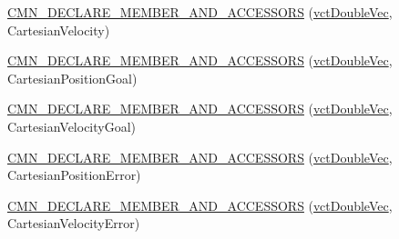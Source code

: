 {\bf }\par
\begin{DoxyCompactItemize}
\item 
\hyperlink{classprm_robot_state_a478deba9609acbb19a1e6df99b8b9c9d}{C\+M\+N\+\_\+\+D\+E\+C\+L\+A\+R\+E\+\_\+\+M\+E\+M\+B\+E\+R\+\_\+\+A\+N\+D\+\_\+\+A\+C\+C\+E\+S\+S\+O\+R\+S} (\hyperlink{vct_dynamic_vector_types_8h_ade4b3068c86fb88f41af2e5187e491c2}{vct\+Double\+Vec}, Cartesian\+Velocity)
\end{DoxyCompactItemize}

{\bf }\par
\begin{DoxyCompactItemize}
\item 
\hyperlink{classprm_robot_state_ae850d261074abb0f5635812cfe87d989}{C\+M\+N\+\_\+\+D\+E\+C\+L\+A\+R\+E\+\_\+\+M\+E\+M\+B\+E\+R\+\_\+\+A\+N\+D\+\_\+\+A\+C\+C\+E\+S\+S\+O\+R\+S} (\hyperlink{vct_dynamic_vector_types_8h_ade4b3068c86fb88f41af2e5187e491c2}{vct\+Double\+Vec}, Cartesian\+Position\+Goal)
\end{DoxyCompactItemize}

{\bf }\par
\begin{DoxyCompactItemize}
\item 
\hyperlink{classprm_robot_state_ac9f1b5e94ebf1e20b5fab040bb774a7c}{C\+M\+N\+\_\+\+D\+E\+C\+L\+A\+R\+E\+\_\+\+M\+E\+M\+B\+E\+R\+\_\+\+A\+N\+D\+\_\+\+A\+C\+C\+E\+S\+S\+O\+R\+S} (\hyperlink{vct_dynamic_vector_types_8h_ade4b3068c86fb88f41af2e5187e491c2}{vct\+Double\+Vec}, Cartesian\+Velocity\+Goal)
\end{DoxyCompactItemize}

{\bf }\par
\begin{DoxyCompactItemize}
\item 
\hyperlink{classprm_robot_state_a592d31476a58e719652e78921e5d16d5}{C\+M\+N\+\_\+\+D\+E\+C\+L\+A\+R\+E\+\_\+\+M\+E\+M\+B\+E\+R\+\_\+\+A\+N\+D\+\_\+\+A\+C\+C\+E\+S\+S\+O\+R\+S} (\hyperlink{vct_dynamic_vector_types_8h_ade4b3068c86fb88f41af2e5187e491c2}{vct\+Double\+Vec}, Cartesian\+Position\+Error)
\end{DoxyCompactItemize}

{\bf }\par
\begin{DoxyCompactItemize}
\item 
\hyperlink{classprm_robot_state_ae6fee3716d13e60f2ab0965da873e9a1}{C\+M\+N\+\_\+\+D\+E\+C\+L\+A\+R\+E\+\_\+\+M\+E\+M\+B\+E\+R\+\_\+\+A\+N\+D\+\_\+\+A\+C\+C\+E\+S\+S\+O\+R\+S} (\hyperlink{vct_dynamic_vector_types_8h_ade4b3068c86fb88f41af2e5187e491c2}{vct\+Double\+Vec}, Cartesian\+Velocity\+Error)
\end{DoxyCompactItemize}

